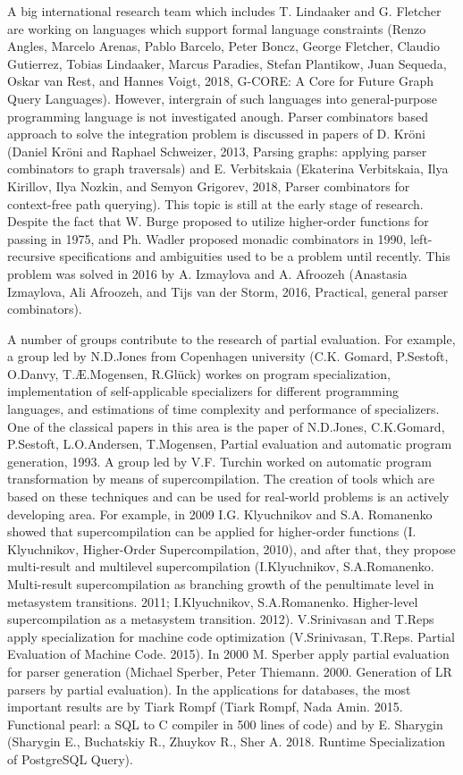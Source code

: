 \documentclass[12pt]{article}  %
\theoremstyle{remark}
\begin{document}
A big international research team which includes T. Lindaaker and G. Fletcher are working on languages which support formal language constraints (Renzo Angles, Marcelo Arenas, Pablo Barcelo, Peter Boncz, George Fletcher, Claudio Gutierrez, Tobias Lindaaker, Marcus Paradies, Stefan Plantikow, Juan Sequeda, Oskar van Rest, and Hannes Voigt, 2018, G-CORE: A Core for Future Graph Query Languages).
However, intergrain of such languages into general-purpose programming language is not investigated anough.
Parser combinators based approach to solve the integration problem is discussed in papers of D.  Kröni (Daniel Kröni and Raphael Schweizer, 2013, Parsing graphs: applying parser combinators to graph traversals) and  E. Verbitskaia (Ekaterina Verbitskaia, Ilya Kirillov, Ilya Nozkin, and Semyon Grigorev, 2018, Parser combinators for context-free path querying).
This topic is still at the early stage of research.
Despite the fact that W. Burge proposed to utilize higher-order functions for passing in 1975, and Ph. Wadler proposed monadic combinators in 1990, left-recursive specifications and ambiguities used to be a problem  until recently.
This problem was solved in 2016 by A. Izmaylova and A. Afroozeh (Anastasia Izmaylova, Ali Afroozeh, and Tijs van der Storm, 2016, Practical, general parser combinators).

A number of groups contribute to the research of partial evaluation.
For example, a group led by N.D.Jones from Copenhagen university (C.K. Gomard, P.Sestoft, O.Danvy, T.Æ.Mogensen, R.Glück) workes on program specialization, implementation of self-applicable specializers for different programming languages, and estimations of time complexity and performance of specializers.
One of the classical papers in this area is the paper of N.D.Jones, C.K.Gomard, P.Sestoft, L.O.Andersen, T.Mogensen,
Partial evaluation and automatic program generation, 1993.
A group led by V.F. Turchin worked on automatic program transformation by means of supercompilation.
The creation of tools which are based on these techniques and can be used for real-world problems is an actively developing area.
For example, in 2009 I.G. Klyuchnikov and S.A. Romanenko showed that supercompilation can be applied for higher-order functions (I. Klyuchnikov, Higher-Order Supercompilation, 2010), and after that, they propose multi-result and multilevel supercompilation
(I.Klyuchnikov, S.A.Romanenko. Multi-result supercompilation as branching growth of the penultimate level in metasystem transitions. 2011; I.Klyuchnikov, S.A.Romanenko. Higher-level supercompilation as a metasystem transition. 2012).
V.Srinivasan and T.Reps apply specialization for machine code optimization (V.Srinivasan, T.Reps. Partial Evaluation of Machine Code. 2015).
In 2000 M. Sperber apply partial evaluation for parser generation (Michael Sperber, Peter Thiemann. 2000. Generation of LR parsers by partial evaluation).
In the applications for databases, the most important results are by Tiark Rompf (Tiark Rompf, Nada Amin. 2015. Functional pearl: a SQL to C compiler in 500 lines of code) and by E. Sharygin (Sharygin E., Buchatskiy R., Zhuykov R., Sher A. 2018. Runtime Specialization of PostgreSQL Query).
\end{document}
